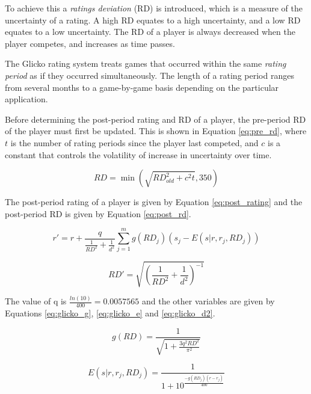 To achieve this a \emph{ratings deviation} (RD) is introduced, which is a measure of the uncertainty of a rating.
A high RD equates to a high uncertainty, and a low RD equates to a low uncertainty.
The RD of a player is always decreased when the player competes, and increases as time passes.

The Glicko rating system treats games that occurred within the same \emph{rating period} as if they occurred simultaneously.
The length of a rating period ranges from several months to a game-by-game basis depending on the particular application.

Before determining the post-period rating and RD of a player, the pre-period RD of the player must first be updated.
This is shown in Equation \ref{eq:pre_rd}, where $t$ is the number of rating periods since the player last competed, and $c$ is a constant that controls the volatility of increase in uncertainty over time.

\begin{equation} \label{eq:pre_rd}
RD = \min \left( \sqrt{RD_{old}^2 + c^2t}, 350 \right)
\end{equation}

The post-period rating of a player is given by Equation \ref{eq:post_rating} and the post-period RD is given by Equation \ref{eq:post_rd}.

\begin{equation} \label{eq:post_rating}
r' = r + \frac{q}{\frac{1}{RD^2} + \frac{1}{d^2}} \sum \limits_{j=1}^m g \left( RD_j \right) \left( s_j - E \left( s | r, r_j, RD_j \right) \right)
\end{equation}

\begin{equation} \label{eq:post_rd}
RD' = \sqrt{\left( \frac{1}{RD^2} + \frac{1}{d^2} \right)^{-1}}
\end{equation}

The value of q is $\frac{ln \left( 10 \right)}{400} = 0.0057565$ and the other variables are given by Equations \ref{eq:glicko_g}, \ref{eq:glicko_e} and \ref{eq:glicko_d2}.

\begin{equation} \label{eq:glicko_g}
g \left( RD \right) = \frac{1}{\sqrt{1 + \frac{3 q^2 RD^2}{\pi^2}}}
\end{equation}

\begin{equation} \label{eq:glicko_e}
E \left( s | r, r_j, RD_j \right) = \frac{1}{1 + 10^{\frac{-g \left( RD_j \right) \left( r - r_j \right)}{400}}}
\end{equation}

